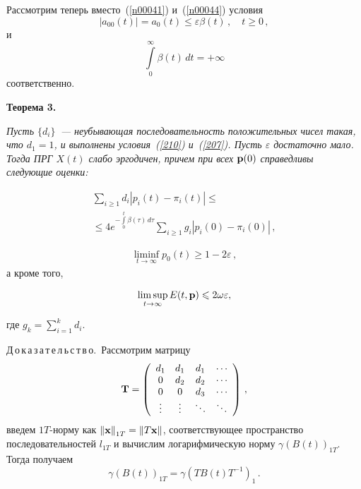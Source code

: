 \begin{multicols}{2}
\vspace*{-2pt}


Рассмотрим теперь вместо~(\ref{n00041}) и~(\ref{n00044}) условия
\begin{equation}
|a_{00}(t)| = a_0(t) \le \varepsilon \beta (t)\,,\quad t \ge 0\,,
\label{210}
\end{equation}
 и
\begin{equation} 
\int\limits_0^{\infty} \beta (t)\, dt = +\infty
\label{207} 
\end{equation}
соответственно.

\medskip

\noindent
{\bf Теорема 3. } {\it Пусть $\{d_i\}$~--- неубывающая
последовательность положительных чисел такая, что $d_1=1$, 
и выполнены условия~(\ref{210}) и~(\ref{207}). Пусть
$\varepsilon$ достаточно мало. Тогда ПРГ $X(t)$ слабо эргодичен,
причем при всех ${\bf p}(0)$ справедливы следующие оценки:


\vspace*{-1pt}

\noindent
\begin{multline}
\sum_{i \ge 1} d_i \left|p_i(t) - \pi_i(t)\right|  \le{}\\[-2pt]
{}\le  4e^{-\int\limits_0^t
\beta (\tau)\, d\tau} \sum_{i \ge 1} g_i \left|p_i(0) -
\pi_i(0)\right| \,, 
\label{n00045b}
\end{multline}

\vspace*{-2pt}

\noindent
\begin{eqnarray}
\liminf_{t \to \infty} p_0(t) \ge 1 - 2\varepsilon\,, 
\label{n00048b}
\end{eqnarray}
а кроме того,

\noindent
\begin{eqnarray}
\limsup_{t \to \infty} E(t,{\bf p}) \le
 2\omega\varepsilon,
\label{n00049b}
\end{eqnarray}

\vspace*{-1pt}

\noindent
где $g_k = \sum\limits_{i=1}^{k} d_i $.}

\smallskip

\noindent
Д\,о\,к\,а\,з\,а\,т\,е\,л\,ь\,с\,т\,в\,о.~Рассмотрим матрицу 
\begin{equation*}
  {\bf T}=\left(
  \begin{array}{ccccc}
  d_1 & d_1 & d_1 & \cdots  \\
  0   & d_2 & d_2 & \cdots  \\
  0   & 0   & d_3 & \cdots  \\
  \vdots & \vdots & \ddots & \ddots
  \end{array}
  \right)\,,
\end{equation*}
введем $1T$-норму как $\left\| {\bf x} \right\|_{1T} =
\left\| T{\bf x}\right\|$, соответствующее пространство
последовательностей $l_{1T}$ и вычислим логарифмическую норму
$\gamma \left(B(t)\right)_{1T}$. Тогда получаем
\begin{equation*}
\gamma \left(B(t)\right)_{1T} = \gamma \left(TB(t)T^{-1}\right)_{1}\,.
\end{equation*}


\end{multicols}
